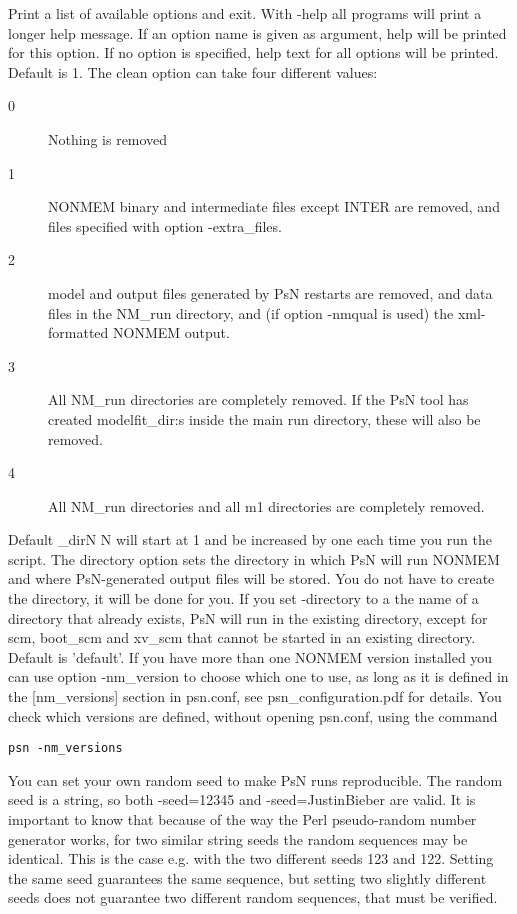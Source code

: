 \begin{optionlist}
Print a list of available options and exit. 
\nextopt
{}
With -help all programs will print a longer help message. If an option name is given as argument, help will be printed for this option. If no option is specified, help text for all options will be printed. 
\nextopt
{}
Default is 1. The clean option can take four different values:  
\begin{description}
	\item[0] Nothing is removed 
	\item[1] NONMEM binary and intermediate files except INTER are removed, and files specified with option -extra\_files. 
	\item[2] model and output files generated by PsN restarts are removed, and data files in the NM\_run directory, and (if option -nmqual is used) the xml-formatted NONMEM output. 
	\item[3] All NM\_run directories are completely removed. If the PsN tool has created modelfit\_dir:s inside the main run directory, these  will also be removed. 
	\item[4] All NM\_run directories and all m1 directories are completely removed.
\end{description}
\nextopt
{}
Default \guidetoolname\_dirN
N will start at 1 and be increased by one each time you run the script. The directory option sets the directory in which PsN 
will run NONMEM and where PsN-generated output files will be stored. You do not have to create the directory,  it will be done for you. If you set -directory to a the name of a directory that already exists, PsN will run in the existing directory, except for scm, boot\_scm and xv\_scm that cannot be started in an existing directory.
\nextopt
{}
Default is 'default'. 
If you have more than one NONMEM version installed you can use option -nm\_version to choose which one to use, as long as it is 
defined in the [nm\_versions] section in psn.conf, see psn\_configuration.pdf for details. You check which versions are defined, without opening psn.conf, using the command
\begin{verbatim}
psn -nm_versions
\end{verbatim}
\nextopt
{}
You can set your own random seed to make PsN runs reproducible. The random seed is a string, so both -seed=12345 and -seed=JustinBieber are valid. It is important to know that because of the way the Perl pseudo-random number generator works, for two similar string seeds the random sequences may be identical. This is the case e.g. with the two different seeds 123 and 122. 
Setting the same seed guarantees the same sequence, but setting two slightly different seeds does not guarantee two different random sequences, that must be verified.
\nextopt


\end{optionlist}
